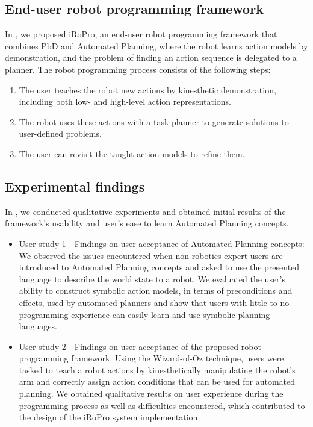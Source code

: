 \subsection{End-user robot programming framework}
In , we proposed iRoPro, an end-user robot programming framework that combines PbD and Automated Planning, where the robot learns action models by demonstration, and the problem of finding an action sequence is delegated to a planner.
The robot programming process consists of the following steps:
		\begin{enumerate}
			\item The user teaches the robot new actions by kinesthetic demonstration, including both low- and high-level action representations.
			\item The robot uses these actions with a task planner to generate solutions to user-defined problems.
			\item The user can revisit the taught action models to refine them.
		\end{enumerate}

	
\subsection{Experimental findings}
In , we conducted qualitative experiments and obtained initial results of the framework's usability and user's ease to learn Automated Planning concepts.
\begin{itemize}
	\item {User study 1 - Findings on user acceptance of Automated Planning concepts:
		We observed the issues encountered when non-robotics expert users are introduced to Automated Planning concepts and asked to use the presented language to describe the world state to a robot. 
		We evaluated the user's ability to construct symbolic action models, in terms of preconditions and effects, used by automated planners and show that users with little to no programming experience can easily learn and use symbolic planning languages.
	}
	\item {User study 2 - Findings on user acceptance of the proposed robot programming framework:
	Using the Wizard-of-Oz technique, users were tasked to teach a robot actions by kinesthetically manipulating the robot's arm and correctly assign action conditions that can be used for automated planning.
	We obtained qualitative results on user experience during the programming process as well as difficulties encountered, which contributed to the design of the iRoPro system implementation.
	}
\end{itemize}
	
